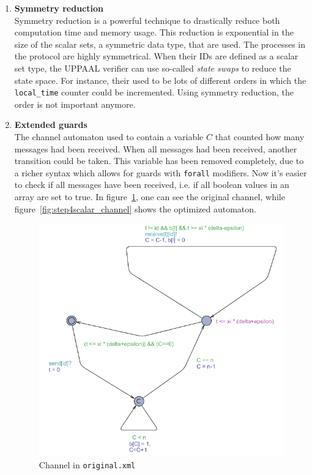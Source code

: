 \documentclass[a4paper,10pt]{article}
\newcommand{\UPPAAL}{UPPAAL\xspace}
\begin{document}
\begin{enumerate}
\item \textbf{Symmetry reduction} \\
	Symmetry reduction \cite{Hendriks2004Adding} is a powerful technique to drastically reduce both computation time and memory usage. This reduction is exponential in the size of the scalar sets, a symmetric data type, that are used. The processes in the protocol are highly symmetrical. When their IDs are defined as a scalar set type, the \UPPAAL verifier can use so-called \textit{state swaps} to reduce the state space. For instance, their used to be lots of different orders in which the \texttt{local\_time} counter could be incremented. Using symmetry reduction, the order is not important anymore.

\item \textbf{Extended guards} \\
	The channel automaton used to contain a variable \(C\) that counted how many messages had been received. When all messages had been received, another transition could be taken. This variable has been removed completely, due to a richer syntax which allows for guards with \texttt{forall} modifiers. Now it's easier to check if all messages have been received, i.e. if all boolean values in an array are set to true. In figure~\ref{fig:original_channel}, one can see the original channel, while figure~\ref{fig:step4scalar_channel} shows the optimized automaton.

\begin{figure}[!h]
\includegraphics[scale=0.7]{original_channel}
\caption{Channel in \texttt{original.xml}\label{fig:original_channel}}
\end{figure}


\end{enumerate}
\end{document}

